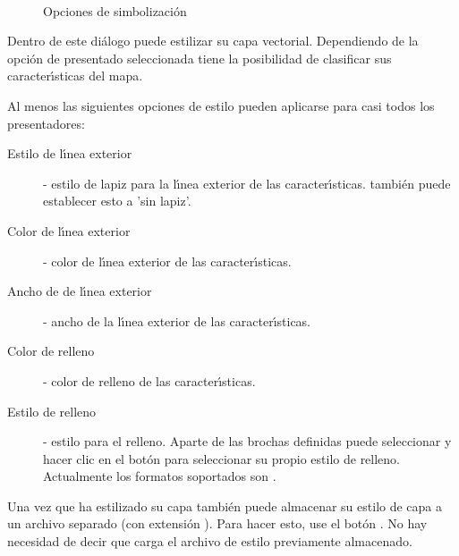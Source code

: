 \begin{figure}[h]
\centering
\caption{Opciones de simbolizaci\'on \nixcaption}
   \goodgap
   \\
   \goodgap
\end{figure}


 \label{sec:style_options} 
Dentro de este di\'alogo puede estilizar su capa vectorial. Dependiendo de la opci\'on de presentado
seleccionada tiene la posibilidad de clasificar sus caracter\'{\i}sticas del mapa.

Al menos las siguientes opciones de estilo pueden aplicarse para casi todos los presentadores:
\begin{description}
 \item[Estilo de l\'{\i}nea exterior] - estilo de lapiz para la l\'{\i}nea exterior de las caracter\'{\i}sticas. también puede establecer
 esto a 'sin lapiz'.
 \item[Color de l\'{\i}nea exterior] - color de l\'{\i}nea exterior de las caracter\'{\i}sticas.
 \item[Ancho de de l\'{\i}nea exterior] - ancho de la l\'{\i}nea exterior de las caracter\'{\i}sticas.
 \item[Color de relleno] - color de relleno de las caracter\'{\i}sticas.
 \item[Estilo de relleno] - estilo para el relleno. Aparte de las brochas definidas puede
 seleccionar  y hacer clic en el bot\'on \browsebutton
 para seleccionar su propio estilo de relleno. Actualmente los formatos soportados son
 .
\end{description}

Una vez que ha estilizado su capa también puede almacenar su estilo de capa a
un archivo separado (con extensi\'on ).
Para hacer esto, use el bot\'on . No hay necesidad de decir que
 carga el archivo de estilo previamente almacenado.

